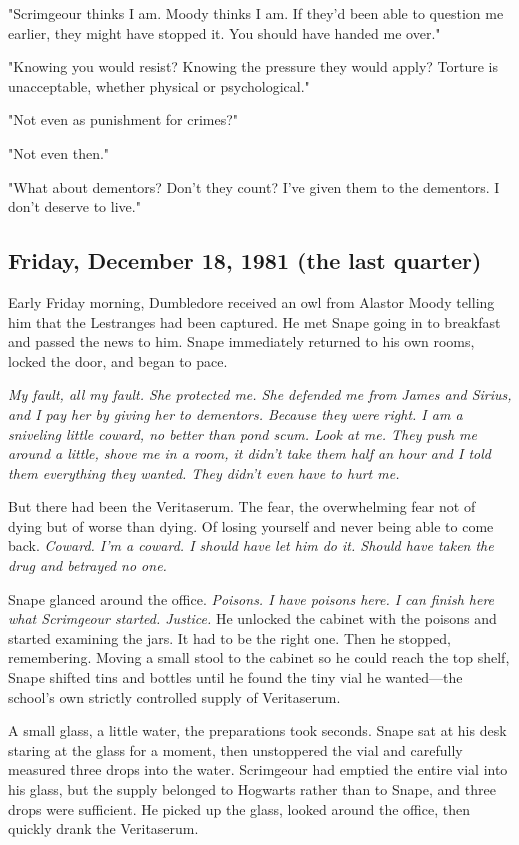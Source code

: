 "Scrimgeour thinks I am. Moody thinks I am. If they'd been able to question me earlier, they might have stopped it. You should have handed me over."

"Knowing you would resist? Knowing the pressure they would apply? Torture is unacceptable, whether physical or psychological."

"Not even as punishment for crimes?"

"Not even then."

"What about dementors? Don't they count? I've given them to the dementors. I don't deserve to live."

\subsection{Friday, December 18, 1981 (the last quarter)}

Early Friday morning, Dumbledore received an owl from Alastor Moody telling him that the Lestranges had been captured. He met Snape going in to breakfast and passed the news to him. Snape immediately returned to his own rooms, locked the door, and began to pace.

\emph{My fault, all my fault. She protected me. She defended me from James and Sirius, and I pay her by giving her to dementors. Because they were right. I am a sniveling little coward, no better than pond scum. Look at me. They push me around a little, shove me in a room, it didn't take them half an hour and I told them everything they wanted. They didn't even have to hurt me.}

But there had been the Veritaserum. The fear, the overwhelming fear not of dying but of worse than dying. Of losing yourself and never being able to come back. \emph{Coward. I'm a coward. I should have let him do it. Should have taken the drug and betrayed no one.}

Snape glanced around the office. \emph{Poisons. I have poisons here. I can finish here what Scrimgeour started. Justice.} He unlocked the cabinet with the poisons and started examining the jars. It had to be the right one. Then he stopped, remembering. Moving a small stool to the cabinet so he could reach the top shelf, Snape shifted tins and bottles until he found the tiny vial he wanted—the school's own strictly controlled supply of Veritaserum.

A small glass, a little water, the preparations took seconds. Snape sat at his desk staring at the glass for a moment, then unstoppered the vial and carefully measured three drops into the water. Scrimgeour had emptied the entire vial into his glass, but the supply belonged to Hogwarts rather than to Snape, and three drops were sufficient. He picked up the glass, looked around the office, then quickly drank the Veritaserum.

